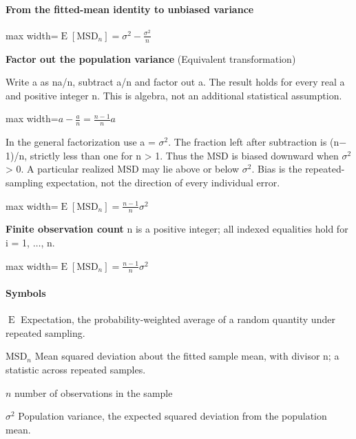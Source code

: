 \documentclass[11pt,a4paper]{article}
\begin{document}
\paragraph{From the fitted-mean identity to unbiased variance}
\begin{center}\begin{adjustbox}{max width=\linewidth}$\displaystyle \operatorname{E}[\mathrm{MSD}_n]=\sigma^2-\frac{\sigma^2}{n}$\end{adjustbox}\end{center}
\noindent\textbf{Factor out the population variance} (Equivalent transformation)\par
Write a as na/n, subtract a/n and factor out a. The result holds for every real a and positive integer n. This is algebra, not an additional statistical assumption.
\begin{center}\begin{adjustbox}{max width=\linewidth}$\displaystyle a-\frac an=\frac{n-1}{n}a$\end{adjustbox}\end{center}

In the general factorization use a = \ensuremath{\sigma}\ensuremath{{}^2}.
The fraction left after subtraction is (n\ensuremath{-}1)/n, strictly less than one for n > 1. Thus the MSD is biased downward when \ensuremath{\sigma}\ensuremath{{}^2} > 0.
A particular realized MSD may lie above or below \ensuremath{\sigma}\ensuremath{{}^2}. Bias is the repeated-sampling expectation, not the direction of every individual error.
\begin{center}\begin{adjustbox}{max width=\linewidth}$\displaystyle \operatorname{E}[\mathrm{MSD}_n]=\frac{n-1}{n}\sigma^2$\end{adjustbox}\end{center}

\par\textbf{Finite observation count} n is a positive integer; all indexed equalities hold for i = 1, \ensuremath{\ldots}, n.
\begin{center}\begin{adjustbox}{max width=\linewidth}$\displaystyle \operatorname{E}[\mathrm{MSD}_n]=\frac{n-1}{n}\sigma^2$\end{adjustbox}\end{center}

\paragraph{Symbols}
\par\noindent\textbf{\(\operatorname{E}\)} Expectation, the probability-weighted average of a random quantity under repeated sampling.
\par\noindent\textbf{\(\mathrm{MSD}_n\)} Mean squared deviation about the fitted sample mean, with divisor n; a statistic across repeated samples.
\par\noindent\textbf{\(n\)} number of observations in the sample
\par\noindent\textbf{\(\sigma^2\)} Population variance, the expected squared deviation from the population mean.
\medskip
\end{document}

